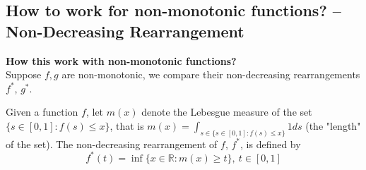 \documentclass[11pt]{elegantbook}
\begin{document}
\subsection{How to work for non-monotonic functions? -- Non-Decreasing Rearrangement}
\begin{note}
    \normalfont
    \textbf{How this work with non-monotonic functions?}\\
    Suppose $f,g$ are non-monotonic, we compare their non-decreasing rearrangements $f^*$, $g^*$.
    \begin{definition}[Rearrangement]
        \normalfont
        Given a function $f$, let $m(x)$ denote the Lebesgue measure of the set $\{s \in[0, 1]: f(s)\leq x\}$, that is $m(x)=\int_{s\in\{s \in[0, 1]: f(s)\leq x\}}1ds$ (the "length" of the set). The non-decreasing rearrangement of $f$, $f^*$, is defined by $$f^*(t) = \inf\{ x \in \mathbb{R}: m(x) \geq t\},\ t\in[0,1]$$
    \end{definition}
\end{note}
\end{document}
